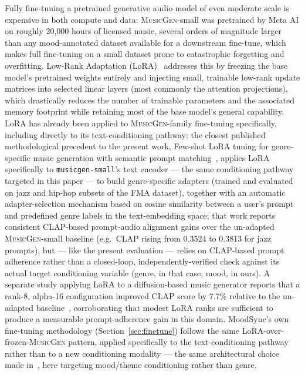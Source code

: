 \documentclass[11pt]{article}
\newcommand{\musicgen}{\textsc{MusicGen}}
\begin{document}
Fully fine-tuning a pretrained generative audio model of even moderate scale is expensive in both compute and data: \musicgen{}-small was pretrained by Meta AI on roughly 20{,}000 hours of licensed music, several orders of magnitude larger than any mood-annotated dataset available for a downstream fine-tune, which makes full fine-tuning on a small dataset prone to catastrophic forgetting and overfitting. Low-Rank Adaptation (LoRA)~\cite{hu2022lora} addresses this by freezing the base model's pretrained weights entirely and injecting small, trainable low-rank update matrices into selected linear layers (most commonly the attention projections), which drastically reduces the number of trainable parameters and the associated memory footprint while retaining most of the base model's general capability. LoRA has already been applied to \musicgen{}-family fine-tuning specifically, including directly to its text-conditioning pathway: the closest published methodological precedent to the present work, Few-shot LoRA tuning for genre-specific music generation with semantic prompt matching~\cite{lee2026loramusicgen}, applies LoRA specifically to \texttt{musicgen-small}'s text encoder --- the same conditioning pathway targeted in this paper --- to build genre-specific adapters (trained and evaluated on jazz and hip-hop subsets of the FMA dataset), together with an automatic adapter-selection mechanism based on cosine similarity between a user's prompt and predefined genre labels in the text-embedding space; that work reports consistent CLAP-based prompt-audio alignment gains over the un-adapted \musicgen{}-small baseline (e.g.\ CLAP rising from 0.3524 to 0.3813 for jazz prompts), but --- like the present evaluation --- relies on CLAP-based prompt adherence rather than a closed-loop, independently-verified check against its actual target conditioning variable (genre, in that case; mood, in ours). A separate study applying LoRA to a diffusion-based music generator reports that a rank-8, alpha-16 configuration improved CLAP score by 7.7\% relative to the un-adapted baseline~\cite{kim2025loradiffusion}, corroborating that modest LoRA ranks are sufficient to produce a measurable prompt-adherence gain in this domain. MoodSync's own fine-tuning methodology (Section~\ref{sec:finetune}) follows the same LoRA-over-frozen-\musicgen{} pattern, applied specifically to the text-conditioning pathway rather than to a new conditioning modality --- the same architectural choice made in~\cite{lee2026loramusicgen}, here targeting mood/theme conditioning rather than genre.
\end{document}
